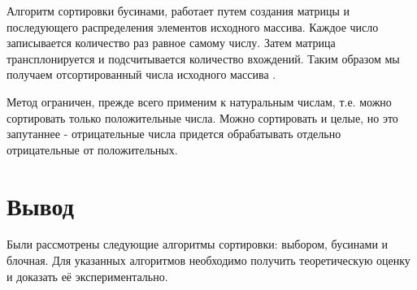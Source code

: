 Алгоритм сортировки  бусинами, работает путем создания матрицы и последующего распределения элементов исходного массива. Каждое число записывается количество раз равное самому числу. Затем матрица трансплонируется и подсчитывается количество вхождений. Таким образом мы получаем отсортированный числа исходного массива \cite{beads}.

Метод ограничен, прежде всего применим к натуральным числам, т.е. можно сортировать только положительные числа. 
Можно сортировать и целые, но это запутаннее - отрицательные числа придется обрабатывать отдельно отрицательные от положительных.


\section*{Вывод}

Были рассмотрены следующие алгоритмы сортировки: выбором, бусинами и блочная. 
Для указанных алгоритмов необходимо получить теоретическую оценку и доказать её экспериментально.